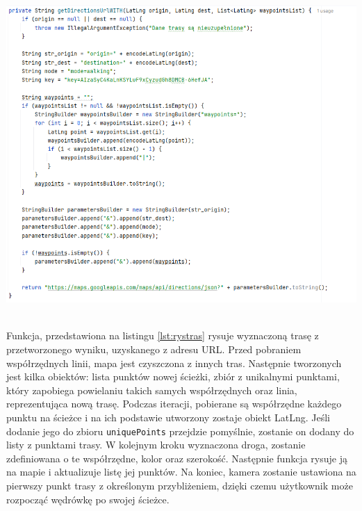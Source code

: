 \noindent
\begin{minipage}{\linewidth}
    \label{lst:trasa}
    \centering
    \includegraphics[width=0.6\linewidth]{img/kod/trasa.png}
\end{minipage}
\\

Funkcja, przedstawiona na listingu \ref{lst:rystras} rysuje wyznaczoną trasę z przetworzonego wyniku, uzyskanego z adresu URL. Przed pobraniem współrzędnych linii, mapa jest czyszczona z innych tras. Następnie tworzonych jest kilka obiektów: lista punktów nowej ścieżki, zbiór z unikalnymi punktami, który zapobiega powielaniu takich samych współrzędnych oraz linia, reprezentująca nową trasę. Podczas iteracji, pobierane są współrzędne każdego punktu na ścieżce i na ich podstawie utworzony zostaje obiekt LatLng. Jeśli dodanie jego do zbioru \verb|uniquePoints| przejdzie pomyślnie, zostanie on dodany do listy z punktami trasy. W kolejnym kroku wyznaczona droga, zostanie zdefiniowana o te współrzędne, kolor oraz szerokość. Następnie funkcja rysuje ją na mapie i aktualizuje listę jej punktów. Na koniec, kamera zostanie ustawiona na pierwszy punkt trasy z określonym przybliżeniem, dzięki czemu użytkownik może rozpocząć wędrówkę po swojej ścieżce.\\

